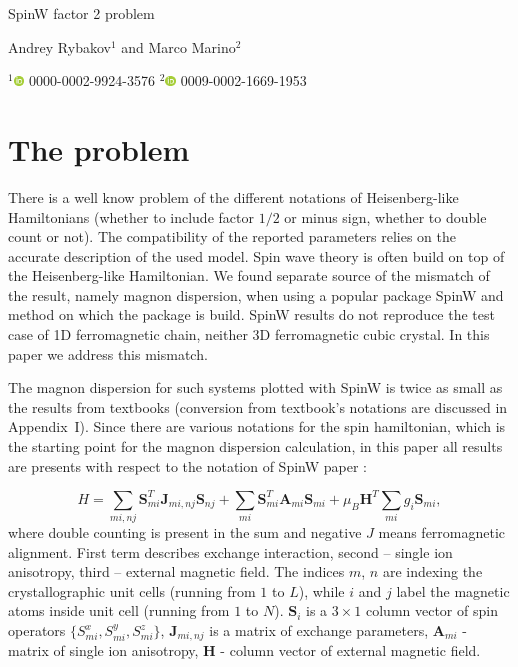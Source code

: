 \documentclass[a4paper,12pt]{article}
\newcommand{\orcid}[1]{\href{https://orcid.org/#1}{\includegraphics[height=8pt]{orcid_16x16.png}} #1}
\begin{document}
    \begin{center}
    \centering \LARGE SpinW factor 2 problem

    \vspace{1cm}
    \small Andrey Rybakov$^1$ and Marco Marino$^2$

    \footnotesize $^1$\orcid{0000-0002-9924-3576}
    \footnotesize $^2$\orcid{0009-0002-1669-1953}
    \end{center}

    \section{The problem}

        There is a well know problem of the different notations of Heisenberg-like Hamiltonians (whether to include factor $1/2$ or minus sign, whether to double count or not). 
        The compatibility of the reported parameters relies on the accurate description of the used model. 
        Spin wave theory is often build on top of the Heisenberg-like Hamiltonian.
        We found separate source of the mismatch of the result, namely magnon dispersion, when using a popular package SpinW \cite{SpinW} and method \cite{toth2015linear} on which the package is build.
        SpinW \cite{SpinW} results do not reproduce the test case of 1D ferromagnetic chain, neither 3D ferromagnetic cubic crystal. In this paper we address this mismatch.


        The magnon dispersion for such systems plotted with SpinW is twice as small as the results from textbooks 
        \cite{rezende2020fundamentals, blundell2003magnetism, gurevich1996magnetization, simon2013oxford, coey2010magnetism, jensen1991rare, white1983quantum} (conversion from textbook's notations are discussed in Appendix~I). 
        Since there are various notations for the spin hamiltonian, which is the starting point for the magnon dispersion calculation, 
        in this paper all results are presents with respect to the notation of SpinW paper \cite{toth2015linear}:

        \begin{equation}
            H = \sum_{mi,nj}\boldsymbol{S}^T_{mi}\boldsymbol{J}_{mi, nj}\boldsymbol{S}_{nj} + 
            \sum_{mi}\boldsymbol{S}^T_{mi}\boldsymbol{A}_{mi}\boldsymbol{S}_{mi} + 
            \mu_B\boldsymbol{H}^T\sum_{mi}g_i\boldsymbol{S}_{mi},
        \end{equation}
        where double counting is present in the sum and negative $J$ means ferromagnetic alignment. 
        First term describes exchange interaction, second -- single ion anisotropy, third -- external magnetic field.
        The indices $m$, $n$ are indexing the crystallographic unit cells (running from $1$ to $L$), while $i$ and $j$ label the magnetic atoms inside unit cell (running from $1$ to $N$).
        $\boldsymbol{S}_i$ is a $3 \times 1$ column vector of spin operators $\{S_{mi}^x, S_{mi}^y, S_{mi}^z\}$, 
        $\boldsymbol{J}_{mi, nj}$ is a matrix of exchange parameters, $\boldsymbol{A}_{mi}$ - matrix of single ion anisotropy,  
        $\boldsymbol{H}$ - column vector of external magnetic field. 
\end{document}
